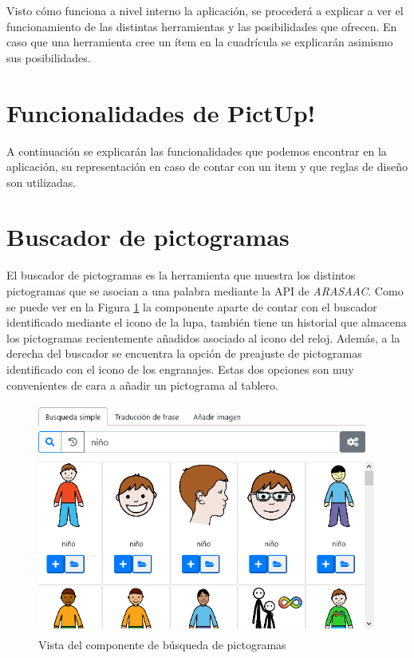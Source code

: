 Visto cómo funciona a nivel interno la aplicación, se procederá a explicar a ver el funcionamiento de las distintas herramientas y las posibilidades que ofrecen. En caso que una herramienta cree un ítem en la cuadrícula se explicarán asimismo sus posibilidades. 


\section*{Funcionalidades de PictUp!}

A continuación se explicarán las funcionalidades que podemos encontrar en la aplicación, su representación en caso de contar con un item y que reglas de diseño son utilizadas.

\section{Buscador de pictogramas}

El buscador de pictogramas es la herramienta que muestra los distintos pictogramas que se asocian a una palabra mediante la API de \textit{ARASAAC}. Como se puede ver en la Figura \ref{fig:buscarpicto2} la componente aparte de contar con el buscador identificado mediante el icono de la lupa, también tiene un historial que almacena los pictogramas recientemente añadidos asociado al icono del reloj. Además, a la derecha del buscador se encuentra la opción de preajuste de pictogramas identificado con el icono de los engranajes. Estas dos opciones son muy convenientes de cara a añadir un pictograma al tablero. 


\begin{figure}[h!]
	\centering
	\includegraphics[width=0.7\linewidth]{Imagenes/Bitmap/buscarPicto2}
	\caption{Vista del componente de búsqueda de pictogramas}
	\label{fig:buscarpicto2}
\end{figure}


